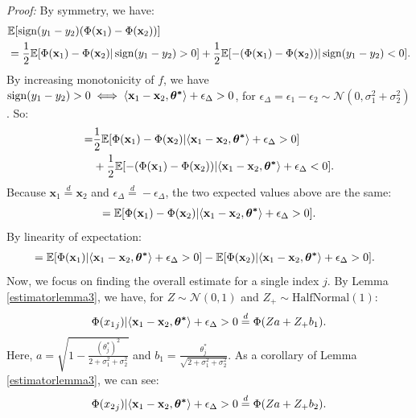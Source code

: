 \documentclass{article} %
\begin{document}
\textit{Proof:} By symmetry, we have:
\begin{align*}
&\mathbb{E}[\operatorname{sign}(y_1 - y_2) (\Phi(\mathbf{x}_1) - \Phi(\mathbf{x}_2))]\\
&= \frac{1}{2}\mathbb{E}[\Phi(\mathbf{x}_1) - \Phi(\mathbf{x}_2)|\operatorname{sign}(y_1 - y_2) > 0] + \frac{1}{2}\mathbb{E}[-(\Phi(\mathbf{x}_1) - \Phi(\mathbf{x}_2))|\operatorname{sign}(y_1 - y_2) < 0].
\end{align*}
By increasing monotonicity of $f$, we have $\operatorname{sign}(y_1-y_2)>0 \iff \langle \mathbf{x}_1 - \mathbf{x}_2, \bm{{\bf{\theta}^*}}\rangle + \epsilon_\Delta > 0$, for $\epsilon_\Delta = \epsilon_1 - \epsilon_2 \sim \mathcal{N}(0,\sigma^2_1 + \sigma^2_2)$. So:
\begin{align*}
=& \frac{1}{2}\mathbb{E}[\Phi(\mathbf{x}_1) - \Phi(\mathbf{x}_2)|\langle \mathbf{x}_1 - \mathbf{x}_2,\bm{{\bf{\theta}^*}}\rangle + \epsilon_\Delta > 0]\\
&+ \frac{1}{2}\mathbb{E}[-(\Phi(\mathbf{x}_1) - \Phi(\mathbf{x}_2))|\langle \mathbf{x}_1 - \mathbf{x}_2,\bm{{\bf{\theta}^*}}\rangle + \epsilon_\Delta < 0].
\end{align*}
Because $\mathbf{x}_1 \overset{d}{=} \mathbf{x}_2$ and $\epsilon_\Delta \overset{d}{=} -\epsilon_\Delta$, the two expected values above are the same:
\[
=\mathbb{E}[\Phi(\mathbf{x}_1) - \Phi(\mathbf{x}_2)|\langle \mathbf{x}_1 - \mathbf{x}_2,\bm{{\bf{\theta}^*}}\rangle + \epsilon_\Delta > 0].
\]
By linearity of expectation:
\begin{align*}
&= \mathbb{E}[\Phi(\mathbf{x}_1)|\langle \mathbf{x}_1 - \mathbf{x}_2,\bm{{\bf{\theta}^*}}\rangle + \epsilon_\Delta > 0] - \mathbb{E}[\Phi(\mathbf{x}_2)|\langle \mathbf{x}_1 - \mathbf{x}_2,\bm{{\bf{\theta}^*}}\rangle + \epsilon_\Delta > 0].
\end{align*}
Now, we focus on finding the overall estimate for a single index $j$. By Lemma \ref{estimatorlemma3}, we have, for $Z \sim \mathcal{N}(0,1)$ and $Z_{+} \sim \text{HalfNormal}(1)$:
\begin{align*}
\Phi({x_1}_j)|\langle \mathbf{x}_1 - \mathbf{x}_2,\bm{{\bf{\theta}^*}}\rangle + \epsilon_\Delta > 0 \overset{d}{=} \Phi(Za + Z_{+}b_1).
\end{align*}
Here, $a=\sqrt{1-\frac{(\theta_j^*)^2}{2+\sigma^2_1 + \sigma^2_2}}$ and $b_1=\frac{\theta_j^*}{\sqrt{2+\sigma^2_1 + \sigma^2_2}}$. As a corollary of Lemma \ref{estimatorlemma3}, we can see:
\begin{align*}
\Phi({x_2}_j)|\langle \mathbf{x}_1 - \mathbf{x}_2,\bm{{\bf{\theta}^*}}\rangle + \epsilon_\Delta > 0 \overset{d}{=} \Phi(Za + Z_{+}b_2).
\end{align*}
\end{document}
